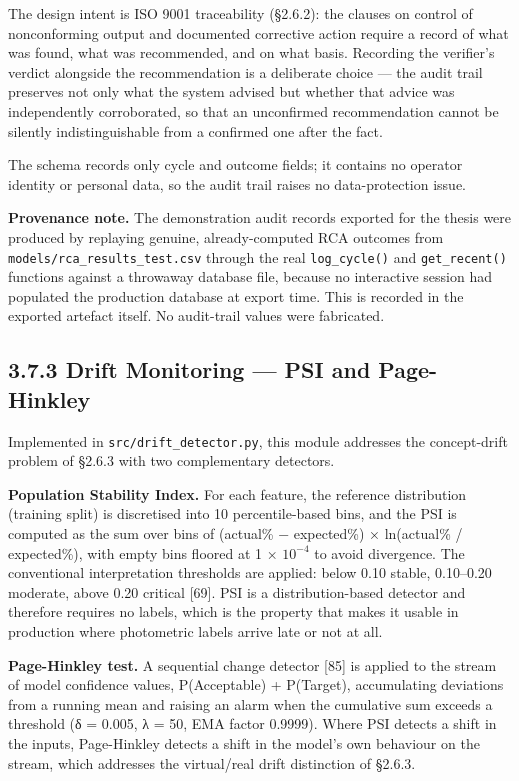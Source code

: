 The design intent is ISO 9001 traceability (§2.6.2): the clauses on control of nonconforming output and documented corrective action require a record of what was found, what was recommended, and on what basis. Recording the verifier's verdict alongside the recommendation is a deliberate choice --- the audit trail preserves not only what the system advised but whether that advice was independently corroborated, so that an unconfirmed recommendation cannot be silently indistinguishable from a confirmed one after the fact.

The schema records only cycle and outcome fields; it contains no operator identity or personal data, so the audit trail raises no data-protection issue.

\textbf{Provenance note.} The demonstration audit records exported for the thesis were produced by replaying genuine, already-computed RCA outcomes from \texttt{models/rca\_results\_test.csv} through the real \texttt{log\_cycle()} and \texttt{get\_recent()} functions against a throwaway database file, because no interactive session had populated the production database at export time. This is recorded in the exported artefact itself. No audit-trail values were fabricated.

\hypertarget{drift-monitoring-psi-and-page-hinkley}{%
\subsection{3.7.3 Drift Monitoring --- PSI and Page-Hinkley}\label{drift-monitoring-psi-and-page-hinkley}}

Implemented in \texttt{src/drift\_detector.py}, this module addresses the concept-drift problem of §2.6.3 with two complementary detectors.

\textbf{Population Stability Index.} For each feature, the reference distribution (training split) is discretised into 10 percentile-based bins, and the PSI is computed as the sum over bins of (actual\% − expected\%) × ln(actual\% / expected\%), with empty bins floored at 1 × $10^{-4}$ to avoid divergence. The conventional interpretation thresholds are applied: below 0.10 stable, 0.10--0.20 moderate, above 0.20 critical {[}69{]}. PSI is a distribution-based detector and therefore requires no labels, which is the property that makes it usable in production where photometric labels arrive late or not at all.

\textbf{Page-Hinkley test.} A sequential change detector {[}85{]} is applied to the stream of model confidence values, P(Acceptable) + P(Target), accumulating deviations from a running mean and raising an alarm when the cumulative sum exceeds a threshold (δ = 0.005, λ = 50, EMA factor 0.9999). Where PSI detects a shift in the inputs, Page-Hinkley detects a shift in the model's own behaviour on the stream, which addresses the virtual/real drift distinction of §2.6.3.

